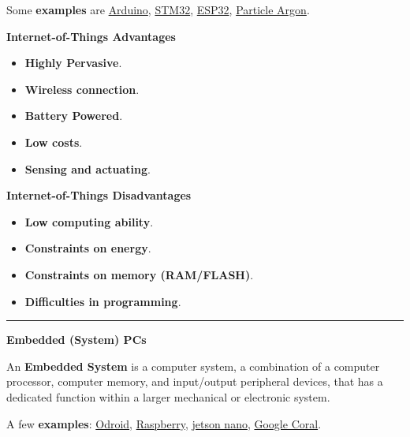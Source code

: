 \documentclass[a4paper]{article}
\newcommand{\longline}{\noindent\rule{\textwidth}{0.4pt}}
\newcommand{\definition}[1]{\textcolor{Red3}{\textbf{#1}}\index{#1}}
\newcommand{\example}[1]{\textcolor{Green4}{\textbf{#1}}}
\newcommand{\highspace}{\vspace{1.2em}\noindent}
\begin{document}
    \highspace
    Some \example{examples} are \href{https://www.arduino.cc/}{Arduino}, \href{https://www.st.com/en/microcontrollers-microprocessors/stm32-32-bit-arm-cortex-mcus.html}{STM32}, \href{https://en.wikipedia.org/wiki/ESP32}{ESP32}, \href{https://docs.particle.io/argon/}{Particle Argon}.

    \begin{flushleft}
        \textcolor{Green3}{ \textbf{Internet-of-Things Advantages}}
    \end{flushleft}
    \begin{itemize}
        \item \textbf{Highly Pervasive}.
        \item \textbf{Wireless connection}.
        \item \textbf{Battery Powered}.
        \item \textbf{Low costs}.
        \item \textbf{Sensing and actuating}.
    \end{itemize}

    \begin{flushleft}
        \textcolor{Red2}{ \textbf{Internet-of-Things Disadvantages}}
    \end{flushleft}
    \begin{itemize}
        \item \textbf{Low computing ability}.
        \item \textbf{Constraints on energy}.
        \item \textbf{Constraints on memory (RAM/FLASH)}.
        \item \textbf{Difficulties in programming}.
    \end{itemize}

    \longline

    \begin{center}
        \large
        \textcolor{Red3}{\textbf{Embedded (System) PCs}}
    \end{center}

    \noindent
    An \definition{Embedded System} is a computer system, a combination of a computer processor, computer memory, and input/output peripheral devices, that has a dedicated function within a larger mechanical or electronic system.

    \highspace
    A few \example{examples}: \href{https://www.hardkernel.com/}{Odroid}, \href{https://www.raspberrypi.com/}{Raspberry}, \href{https://developer.nvidia.com/embedded/jetson-nano}{jetson nano}, \href{https://www.coral.ai/}{Google Coral}.
\end{document}

